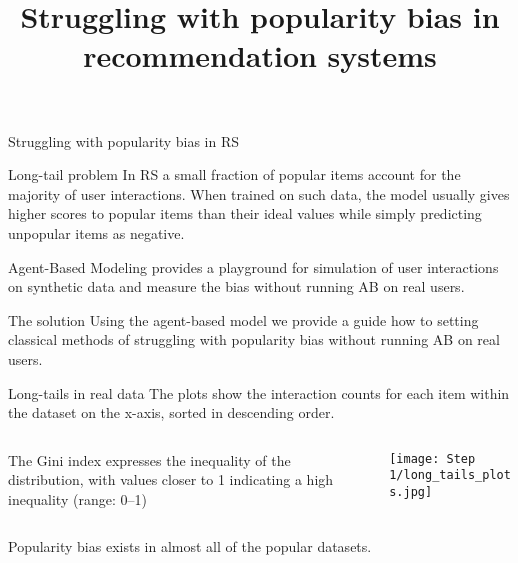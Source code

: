 \documentclass[12pt,pdf,hyperref={unicode}]{beamer}
\title{Struggling with popularity bias in recommendation systems}
\begin{document}
\setcounter{page}{2}%
\begin{frame}{Struggling with popularity bias in RS}
\begin{block}{Long-tail problem}
In RS a small fraction of popular items account for the majority of user interactions. When trained on such data, the model usually gives higher scores to popular items than their ideal values while simply predicting unpopular items as negative.
\end{block}
\begin{block}{Agent-Based Modeling}
provides a playground for simulation of user interactions on synthetic data and measure the bias without running AB on real users.
\end{block}
\begin{block}{The solution} Using the agent-based model we provide a guide how to setting classical methods of struggling with popularity bias without running AB on real users.
\end{block}
\end{frame}
\begin{frame}{Long-tails in real data}
The plots show the interaction counts for each item within the dataset on the x-axis, sorted in descending order. 
\begin{columns}
\begin{column}{0.3\textwidth}
The Gini index expresses the inequality of the distribution, with values closer to 1 indicating a high inequality (range: 0–1)
\end{column}
\begin{column}{0.7\textwidth}
	\texttt{[image: Step 1/long\_tails\_plots.jpg]}      
\end{column}
\end{columns}
\bigskip
Popularity bias exists in almost all of the popular datasets.
\end{frame}
\end{document}
